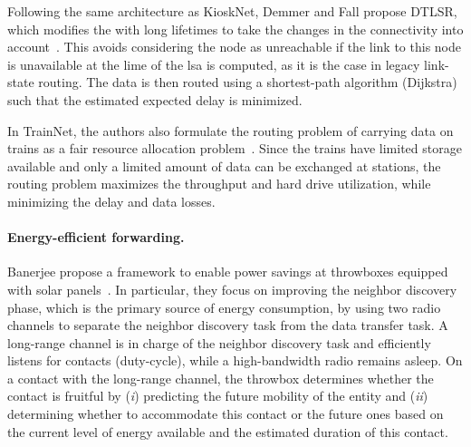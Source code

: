 Following the same architecture as KioskNet, Demmer and Fall propose DTLSR, which modifies the  with long lifetimes to take the changes in the connectivity into account~\cite{demmer2007dtlsr}. This avoids considering the node as unreachable if the link to this node is unavailable at the lime of the \acrshort{lsa} is computed, as it is the case in legacy link-state routing. The data is then routed using a shortest-path algorithm (\eg Dijkstra) such that the estimated expected delay is minimized. 

In TrainNet, the authors also formulate the routing problem of carrying data on trains as a fair resource allocation problem~\cite{zarafshan2010trainnet}. Since the trains have limited storage available and only a limited amount of data can be exchanged at stations, the routing problem maximizes the throughput and hard drive utilization, while minimizing the delay and data losses. 

\paragraph{Energy-efficient forwarding.} 
Banerjee \etal propose a framework to enable power savings at throwboxes equipped with solar panels~\cite{banerjee2007energy}. In particular, they focus on improving the neighbor discovery phase, which is the primary source of energy consumption, by using two radio channels to separate the neighbor discovery task from the data transfer task. A long-range channel is in charge of the neighbor discovery task and efficiently listens for contacts (duty-cycle), while a high-bandwidth radio remains asleep. On a contact with the long-range channel, the throwbox determines whether the contact is fruitful by (\textit{i}) predicting the future mobility of the entity and (\textit{ii}) determining whether to accommodate this contact or the future ones based on the current level of energy available and the estimated duration of this contact.

